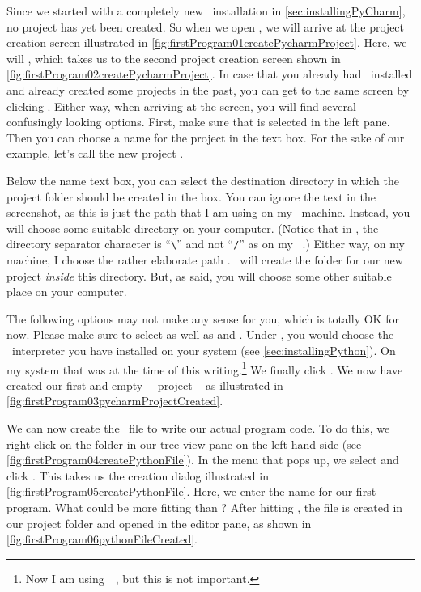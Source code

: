 Since we started with a completely new \pycharm\ installation in \cref{sec:installingPyCharm}, no project has yet been created.
So when we open \pycharm, we will arrive at the project creation screen illustrated in \cref{fig:firstProgram01createPycharmProject}.
Here, we will , which takes us to the second project creation screen shown in \cref{fig:firstProgram02createPycharmProject}.
In case that you already had \pycharm\ installed and already created some projects in the past, you can get to the same screen by clicking .
Either way, when arriving at the screen, you will find several confusingly looking options.
First, make sure that  is selected in the left pane.
Then you can choose a name for the project in the  text box.
For the sake of our example, let's call the new project .

Below the name text box, you can select the destination directory in which the project folder should be created in the  box.
You can ignore the text in the screenshot, as this is just the path that I am using on my \ubuntu\ machine.
Instead, you will choose some suitable directory on your computer.
(Notice that in \microsoftWindows, the directory separator character is ``\verb=\='' and not ``\verb=/='' as on my \ubuntu\ \linux.)
Either way, on my machine, I choose the rather elaborate path .
\pycharm\ will create the folder  for our new project \emph{inside} this directory.
But, as said, you will choose some other suitable place on your computer.

The following options may not make any sense for you, which is totally OK for now.
Please make sure to select  as well as  and .
Under , you would choose the \python\ interpreter you have installed on your system (see \cref{sec:installingPython}).
On my system that was  at the time of this writing.\footnote{%
Now I am using~\python~\pythonVersion, but this is not important.}
We finally click .
We now have created our first and empty \pycharm\ \python\ project -- as illustrated in \cref{fig:firstProgram03pycharmProjectCreated}.

We can now create the \python\ file to write our actual program code.
To do this, we right-click on the folder  in our  tree view pane on the left-hand side (see \cref{fig:firstProgram04createPythonFile}).
In the menu that pops up, we select and click .
This takes us the  creation dialog illustrated in \cref{fig:firstProgram05createPythonFile}.
Here, we enter the name for our first program.
What could be more fitting than ?
After hitting , the file is created in our project folder and opened in the editor pane, as shown in \cref{fig:firstProgram06pythonFileCreated}.

